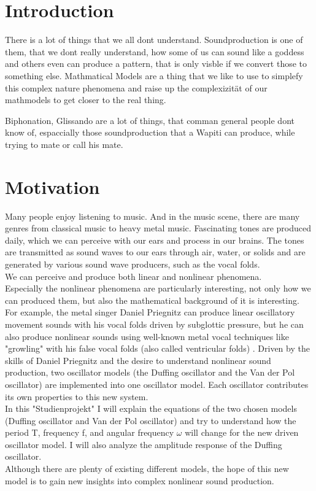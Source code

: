 \documentclass[oneside,10pt,a4paper]{report}
\begin{document}
	
	\tableofcontents
	
	\chapter{Introduction}
	There is a lot of things that we all dont understand. Soundproduction is one of them, that we dont really understand, how some of us can sound like a goddess and others even can produce a pattern, that is only visble if we convert those to something else.
	Mathmatical Models are a thing that we like to use to simplefy this complex nature phenomena and raise up the complexizität of our mathmodels to get closer to the real thing.
	
	Biphonation, Glissando are a lot of things, that comman general people dont know of, espaccially those soundproduction that a Wapiti can produce, while trying to mate or call his mate.
	\chapter{Motivation}
	
		Many people enjoy listening to music. And in the music scene, there are many genres from classical music to heavy metal music. Fascinating tones are produced daily, which we can perceive with our ears and process in our brains. The tones are transmitted as sound waves to our ears through air, water, or solids and are generated by various sound wave producers, such as the vocal folds.\\
		We can perceive and produce both linear and nonlinear phenomena. \\
		Especially the nonlinear phenomena are particularly interesting, not only how we can produced them, but also the mathematical background of it is interesting.\\
		 For example, the metal singer Daniel Priegnitz can produce linear oscillatory movement sounds with his vocal folds driven by subglottic pressure, but he can also produce nonlinear sounds using well-known metal vocal techniques like "growling" with his false vocal folds (also called ventricular folds) \cite{DanielPriegnitz}.
		 Driven by the skills of Daniel Priegnitz and the desire to understand nonlinear sound production, two oscillator models (the Duffing oscillator and the Van der Pol oscillator) are implemented into one oscillator model. Each oscillator contributes its own properties to this new system.\\
		 In this "Studienprojekt" I will explain the equations of the two chosen models (Duffing oscillator and Van der Pol oscillator) and try to understand how the period T, frequency f, and angular frequency $\omega$ will change for the new driven oscillator model. I will also analyze the amplitude response of the Duffing oscillator.\\
		 Although there are plenty of existing different models, the hope of this new model is to gain new insights into complex nonlinear sound production.\\
		
\end{document}
